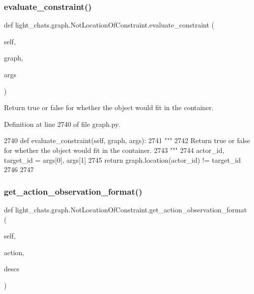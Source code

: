 \subsubsection{\texorpdfstring{evaluate\+\_\+constraint()}{evaluate\_constraint()}}
{\footnotesize\ttfamily def light\+\_\+chats.\+graph.\+Not\+Location\+Of\+Constraint.\+evaluate\+\_\+constraint (\begin{DoxyParamCaption}\item[{}]{self,  }\item[{}]{graph,  }\item[{}]{args }\end{DoxyParamCaption})}

\begin{DoxyVerb}Return true or false for whether the object would fit in the container.
\end{DoxyVerb}
 

Definition at line 2740 of file graph.\+py.


\begin{DoxyCode}
2740     \textcolor{keyword}{def }evaluate\_constraint(self, graph, args):
2741         \textcolor{stringliteral}{"""}
2742 \textcolor{stringliteral}{        Return true or false for whether the object would fit in the container.}
2743 \textcolor{stringliteral}{        """}
2744         actor\_id, target\_id = args[0], args[1]
2745         \textcolor{keywordflow}{return} graph.location(actor\_id) != target\_id
2746 
2747 
\end{DoxyCode}
\mbox{\label{classlight__chats_1_1graph_1_1NotLocationOfConstraint_a4b286f6eeac9d64784dc03087771dc72}} 
\subsubsection{\texorpdfstring{get\+\_\+action\+\_\+observation\+\_\+format()}{get\_action\_observation\_format()}}
{\footnotesize\ttfamily def light\+\_\+chats.\+graph.\+Not\+Location\+Of\+Constraint.\+get\+\_\+action\+\_\+observation\+\_\+format (\begin{DoxyParamCaption}\item[{}]{self,  }\item[{}]{action,  }\item[{}]{descs }\end{DoxyParamCaption})}



